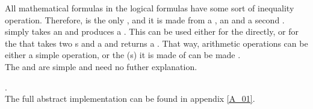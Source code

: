 All mathematical formulas in the logical formulas have some sort of inequality operation. Therefore,  is the only , and it is made from a , an  and a second .\\
 simply takes an  and produces a . This can be used either for the  directly, or for the  that takes two s and a  and returns a . That way, arithmetic operations can be either a simple operation, or the (s) it is made of can be made .\\
The  and  are simple and need no futher explanation.

. \\
The full abstract implementation can be found in appendix \ref{A_01}.